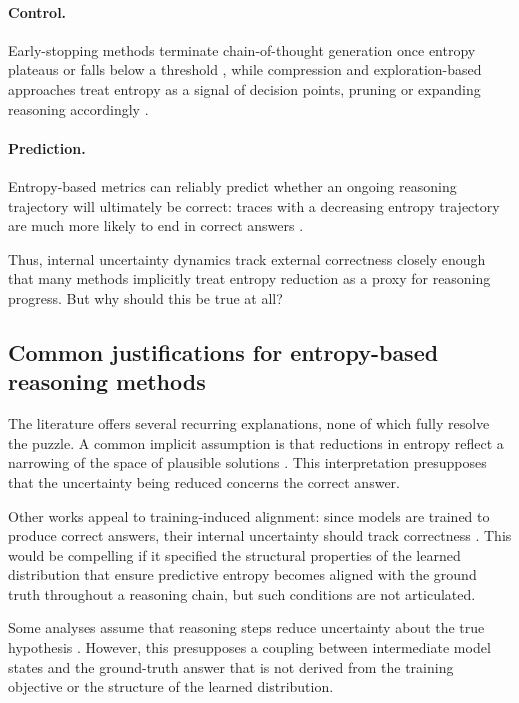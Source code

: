 \documentclass{article}
\begin{document}
\paragraph{Control.}
Early-stopping methods terminate chain-of-thought generation once entropy plateaus or falls below a threshold \cite{ sharma2025thinkjustenoughsequencelevel}, while compression and exploration-based approaches treat entropy as a signal of decision points, pruning or expanding reasoning accordingly \cite{li2025compressingchainofthoughtllmsstep, zhang2025entropybasedexplorationconductionmultistep}.

\paragraph{Prediction.}
Entropy-based metrics can reliably predict whether an ongoing reasoning trajectory will ultimately be correct: traces with a decreasing entropy trajectory are much more likely to end in correct answers \cite{guo2025measuringreasoningutilityllms, liu2025tokensignaturepredictingchainofthought}.

Thus, internal uncertainty dynamics track external correctness closely enough that many methods implicitly treat entropy reduction as a proxy for reasoning progress. But why should this be true at all?

\subsection{Common justifications for entropy-based reasoning methods}

The literature offers several recurring explanations, none of which fully resolve the puzzle. A common implicit assumption is that reductions in entropy reflect a narrowing of the space of plausible solutions \cite{qian2025demystifyingreasoningdynamicsmutual, ton2025understandingchainofthoughtllmsinformation}. This interpretation presupposes that the uncertainty being reduced concerns the correct answer.

Other works appeal to training-induced alignment: since models are trained to produce correct answers, their internal uncertainty should track correctness \cite{sharma2025thinkjustenoughsequencelevel}. This would be compelling if it specified the structural properties of the learned distribution that ensure predictive entropy becomes aligned with the ground truth throughout a reasoning chain, but such conditions are not articulated.

Some analyses assume that reasoning steps reduce uncertainty about the true hypothesis \cite{ton2025understandingchainofthoughtllmsinformation}. However, this presupposes a coupling between intermediate model states and the ground-truth answer that is not derived from the training objective or the structure of the learned distribution.
\end{document}

